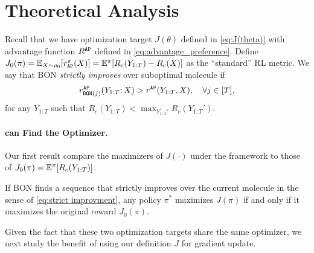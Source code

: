 \section{Theoretical Analysis}\label{sec:theory}
Recall that we have optimization target $J(\theta)$ defined in \eqref{eq:J(theta)} with advantage function $R^{\mathtt{AP}}$ defined in \eqref{eq:advantage_preference}.
Define $J_0(\pi)=\mathbb{E}_{X\sim \rho_0}[r_{\mathtt{AP}}^\pi(X)] = \mathbb{E}^\pi[R_c(Y_{1:T}) - R_c(X)]$ as the ``standard'' RL metric.
We say that BON \emph{strictly improves} over suboptimal molecule if
\begin{align}
    r_{{\mathtt{BON}}(j)}^{\mathtt{AP}}(Y_{1:T}; X) > r^{\mathtt{AP}}(Y_{1:T}, X), \quad \forall  j\in[T], 
    \label{eq:strict improvment}
\end{align}
for any $Y_{1:T}$ such that $R_c(Y_{1:T}) < \max_{Y_{1:T}'} R_c(Y_{1:T}')$.
\paragraph{\algname can Find the Optimizer.}
Our first result compare the maximizers of $J(\cdot)$ under the \algname framework to those of $J_0(\pi) = \mathbb{E}^\pi[R_c(Y_{1:T})]$.
\begin{lemma}
\label{lem:equivalence}
\vspace{+0.3cm}
    If BON finds a sequence that strictly improves over the current molecule in the sense of \eqref{eq:strict improvment},
    any policy $\pi^*$ maximizes $J(\pi)$ if and only if it maximizes the original reward $J_0(\pi)$.
\end{lemma}
Given the fact that these two optimization targets share the same optimizer, we next study the benefit of using our definition $J$ for gradient update.

